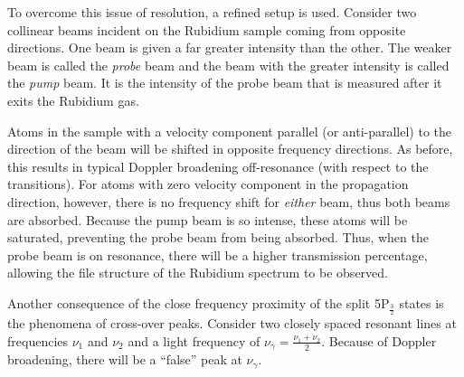 \documentclass[paper=a4, fontsize=11pt]{scrartcl} %
\numberwithin{equation}{section}
\numberwithin{figure}{section}
\numberwithin{table}{section}
\begin{document}
To overcome this issue of resolution, a refined setup is used. Consider two collinear beams incident on the
Rubidium sample coming from opposite directions. One beam is given a far greater intensity than the other. The weaker
beam is called the \emph{probe} beam and the beam with the greater intensity is called the \emph{pump} beam. It is the intensity of the probe beam that is measured after it exits the Rubidium gas.

Atoms in the sample with a velocity component parallel (or anti-parallel) to the direction of the beam will be shifted in opposite frequency directions. As before, this results in typical Doppler broadening off-resonance (with respect to the transitions). For atoms with zero velocity component in the propagation direction, however, there is no frequency shift for \emph{either} beam, thus both beams are absorbed. Because the pump beam is so intense, these atoms will be saturated, preventing the probe beam from being absorbed. Thus, when the probe beam is on resonance, there will be a higher transmission percentage, allowing the file structure of the Rubidium spectrum to be observed.

Another consequence of the close frequency proximity of the split
5P$_{\frac{3}{2}}$ states is the phenomena of cross-over
peaks. Consider two closely spaced resonant lines at frequencies
$\nu_1$ and $\nu_2$ and a light frequency of $\nu_{\gamma} = \frac{\nu_1 +
  \nu_2}{2}$. Because of Doppler broadening, there will be a ``false''
peak at $\nu_{\gamma}$. 
\end{document}
